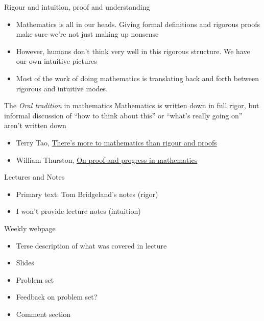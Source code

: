 \documentclass{beamer}
\begin{document}
\begin{frame}{Rigour and intuition, proof and understanding}

\begin{itemize}
\item Mathematics is all in our heads.  Giving formal definitions and rigorous proofs make sure we're not just making up nonsense
\item However, humans don't think very well in this rigorous structure.  We have our own intuitive pictures
\item Most of the work of doing mathematics is translating back and forth between rigorous and intuitive modes.
\end{itemize}


\begin{block}{The \emph{Oral tradition} in mathematics}
Mathematics is written down in full rigor, but informal discussion of ``how to think about this'' or  ``what's really going on'' aren't written down
\end{block}


\begin{itemize}
\item Terry Tao, \href{https://terrytao.wordpress.com/career-advice/there’s-more-to-mathematics-than-rigour-and-proofs/}{There's more to mathematics than rigour and proofs}
\item William Thurston, \href{https://arxiv.org/abs/math/9404236}{On proof and progress in mathematics}
\end{itemize}


\end{frame}


\begin{frame}{Lectures and Notes}

\begin{itemize}
\item  Primary text: Tom Bridgeland's notes (rigor)
\item I won't provide lecture notes (intuition)
\end{itemize}

\begin{block}{Weekly webpage}
\begin{itemize}
\item Terse description of what was covered in lecture
\item Slides
\item Problem set
\item Feedback on problem set?
\item Comment section
\end{itemize}
\end{block}




\end{frame}
\end{document}
